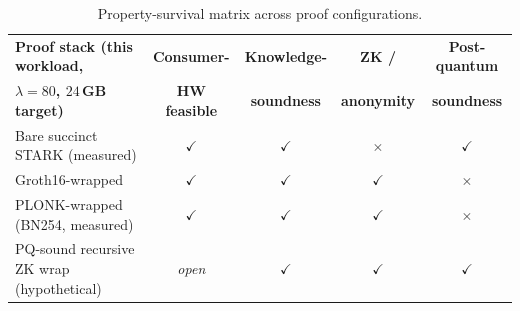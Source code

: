 \begin{table}[H]
    \centering
    \small
    \renewcommand{\arraystretch}{1.3}
    \begin{tabular}{@{}p{4.0cm}cccc@{}}
        \toprule
        \textbf{Proof stack (this workload,} & \textbf{Consumer-} & \textbf{Knowledge-} & \textbf{ZK /} & \textbf{Post-quantum} \\
        \textbf{$\lambda=80$, $24$\,GB target)} & \textbf{HW feasible} & \textbf{soundness} & \textbf{anonymity} & \textbf{soundness} \\
        \midrule
        Bare succinct STARK (measured) & $\checkmark$ & $\checkmark$ & $\times$ & $\checkmark$ \\
        Groth16-wrapped                & $\checkmark$ & $\checkmark$ & $\checkmark$ & $\times$ \\
        PLONK-wrapped (BN254, measured) & $\checkmark$ & $\checkmark$ & $\checkmark$ & $\times$ \\
        PQ-sound recursive ZK wrap (hypothetical) & \emph{open} & $\checkmark$ & $\checkmark$ & $\checkmark$ \\
        \bottomrule
    \end{tabular}
    \caption{Property-survival matrix across proof configurations.}
    \label{tab:property-survival}
\end{table}

